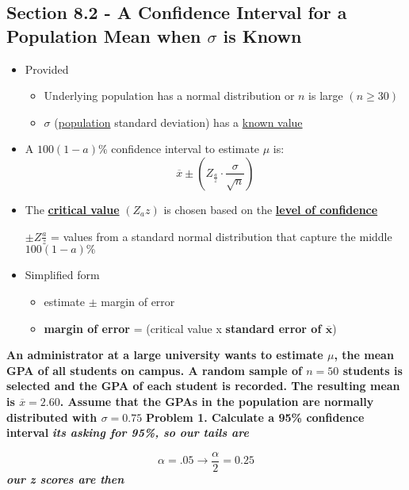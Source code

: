 \documentclass{report}
\begin{document}
    \subsection*{Section 8.2 - A Confidence Interval for a Population Mean when $\sigma$ is Known}
    \begin{itemize}
      \item Provided 
        \begin{itemize}[label=$\circ$]
          \item Underlying population has a normal distribution or $n$ is large $ \left(n \ge 30\right)$
          \item $\sigma$ (\underline{population} standard deviation) has a \underline{known value}
        \end{itemize}
      \item A $100(1 - a)\%$ confidence interval to estimate $\mu$ is: 
        $$ \overline{x}\pm \left(Z_{\frac{a}{z}}\cdot \frac{\sigma}{\sqrt{n}}\right)$$
      \item The \textbf{\underline{critical value}} $ \left(Z_{a}{z}\right)$ is chosen based on the \textbf{\underline{level of confidence}}
        \vspace{1mm}

        \subitem \hspace{-7mm}$\pm{Z\frac{a}{z}}$ = values from a standard normal distribution that capture the middle $100(1-a)\%$
      \item Simplified form
        \begin{itemize}[label=$\circ$]
          \item estimate $\pm${ margin of error}
          \item \textbf{margin of error} = (critical value x \textbf{standard error of $\overline{\mathbf{x}}$})
        \end{itemize}
    \end{itemize}
\q
\textbf{An administrator at a large university wants to estimate $\mu$, the mean GPA of all students on campus. A random sample of $ n = 50$ students is selected and the GPA of each student is recorded. The resulting mean is $\overline{x} = 2.60$. Assume that the GPAs in the population are normally distributed with $\sigma = 0.75$}
\bigbreak \noindent \bigbreak \noindent
\textbf{Problem 1. Calculate a 95\% confidence interval}
\bigbreak \noindent
\textit{\textbf{its asking for 95\%, so our tails are}}

$$ \alpha = .05 \rightarrow \dfrac{\alpha}{2} = 0.25$$
\textit{\textbf{our z scores are then}}
\end{document}
